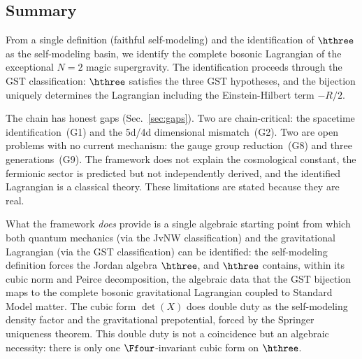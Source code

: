 \subsection{Summary}

From a single definition (faithful self-modeling) and the identification
of $\hthree$ as the self-modeling basin, we identify the complete bosonic
Lagrangian of the exceptional $N{=}2$ magic supergravity. The
identification proceeds through the GST classification: $\hthree$
satisfies the three GST hypotheses, and the bijection uniquely determines
the Lagrangian including the Einstein-Hilbert term $-R/2$.

The chain has honest gaps (Sec.~\ref{sec:gaps}). Two are
chain-critical: the spacetime identification~(G1) and the 5d/4d
dimensional mismatch~(G2). Two are open problems with no current
mechanism: the gauge group reduction~(G8) and three
generations~(G9). The framework
does not explain the cosmological constant, the fermionic sector is
predicted but not independently derived, and the identified Lagrangian
is a classical theory. These limitations are stated because they are
real.

What the framework \emph{does} provide is a single algebraic starting
point from which both quantum mechanics (via the JvNW classification)
and the gravitational Lagrangian (via the GST classification) can be
identified: the self-modeling definition forces the Jordan algebra
$\hthree$, and $\hthree$ contains, within its cubic norm and Peirce
decomposition, the algebraic data that the GST bijection maps to the
complete bosonic gravitational Lagrangian coupled to Standard Model
matter. The cubic form $\det(X)$ does double duty as the self-modeling
density factor and the gravitational prepotential, forced by the
Springer uniqueness theorem. This double duty is not a coincidence but
an algebraic necessity: there is only one $\Ffour$-invariant cubic
form on $\hthree$.
